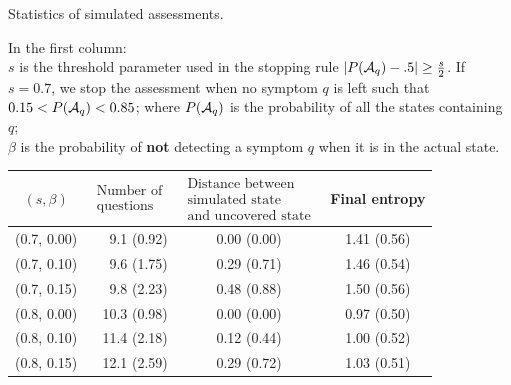 \documentclass{beamer}
\def\bb{\beta}
\def\AAA{{\cal A}}
\begin{document}
\begin{frame}{Statistics of simulated assessments.}
\center
\begin{minipage}{12cm}
\hspace{2cm} {\small In the first column:\\
 $s$  is the threshold  parameter used in the stopping rule 
$| P(\AAA_q) -.5| \geq \frac s2$. If $s=0.7$, we stop the assessment when no symptom $q$ is left such that $0.15<P(\AAA_q)< 0.85$; where $P(\AAA_q)$ is the probability of all the states containing $q$;\\
$\bb$ is the probability of {\bf not} detecting a symptom $q$ when it is in the actual state.} \end{minipage}
  
\begin{center}
  \renewcommand{\arraystretch}{1.3}
\renewcommand{\tabcolsep}{.3cm}
\begin{tabular}{|c|r|c|c|} 
\hline
$(s, \beta)$&$\begin{matrix}\text{Number of}\\[-2mm]\text{questions}\end{matrix}$&
$\begin{matrix}\text{Distance between}\\[-2mm] \text{simulated state}\\[-2mm] \text{and uncovered state}\end{matrix}$&
Final entropy\\
\hline
(0.7, 0.00)&9.1 (0.92)&0.00 (0.00)&1.41 (0.56)\\
(0.7, 0.10)&9.6 (1.75)&0.29 (0.71)&1.46 (0.54)\\
(0.7, 0.15)&9.8 (2.23)&0.48 (0.88)&1.50 (0.56)\\
(0.8, 0.00)&10.3 (0.98)&0.00 (0.00)&0.97 (0.50)\\
(0.8, 0.10)&11.4 (2.18)&0.12 (0.44)&1.00 (0.52)\\
(0.8, 0.15)&12.1 (2.59)&0.29 (0.72)&1.03 (0.51)\\
\hline
\end{tabular}
 \end{center}
\end{frame}
\end{document}
